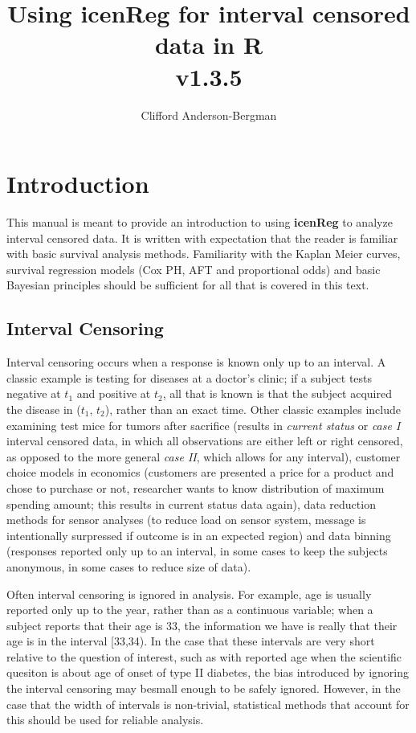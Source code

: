 \documentclass[a4paper]{article}
\begin{document}


\title{Using {\bf{icenReg}} for interval censored data in {\bf{R} } \\ v1.3.5}
\author{Clifford Anderson-Bergman}
\maketitle


\tableofcontents

\section{Introduction}

This manual is meant to provide an introduction to using {\bf icenReg} to analyze interval censored data. It is written with expectation that the reader is familiar with basic survival analysis methods. Familiarity with the Kaplan Meier curves, survival regression models (Cox PH, AFT and proportional odds) and basic Bayesian principles should be sufficient for all that is covered in this text.

\subsection{Interval Censoring}

Interval censoring occurs when a response is known only up to an interval. A classic example is testing for diseases at a doctor's clinic; if a subject tests negative at $t_1$ and positive at $t_2$, all that is known is that the subject acquired the disease in ($t_1$, $t_2$), rather than an exact time. Other classic examples include examining test mice for tumors after sacrifice (results in \emph{current status} or \emph{case I} interval censored data, in which all observations are either left or right censored, as opposed to the more general \emph{case II}, which allows for any interval), customer choice models in economics (customers are presented a price for a product and chose to purchase or not, researcher wants to know distribution of maximum spending amount; this results in current status data again), data reduction methods for sensor analyses (to reduce load on sensor system, message is intentionally surpressed if outcome is in an expected region) and data binning (responses reported only up to an interval, in some cases to keep the subjects anonymous, in some cases to reduce size of data). 

  
Often interval censoring is ignored in analysis. For example, age is usually reported only up to the year, rather than as a continuous variable; when a subject reports that their age is 33, the information we have is really that their age is in the interval [33,34). In the case that these intervals are very short relative to the question of interest, such as with reported age when the scientific quesiton is about age of onset of type II diabetes, the bias introduced by ignoring the interval censoring may besmall enough to be safely ignored. However, in the case that the width of intervals is non-trivial, statistical methods that account for this should be used for reliable analysis. 
  
\end{document}
